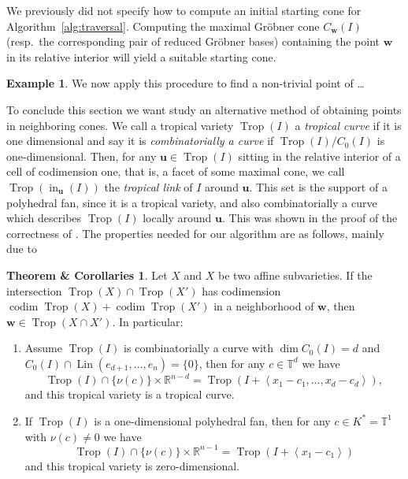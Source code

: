 \documentclass[
  paper=a4,
  titlepage,
  bibliography=totoc,
  listof=totoc,
  pagesize=pdftex
]{scrartcl}
\numberwithin{figure}{section}
\numberwithin{equation}{section}
\numberwithin{table}{section}
\newcommand*\setR{\mathds{R}}
\newcommand*\setT{\mathds{T}}
\newcommand*\ideal[1]{\left\langle #1 \right\rangle}
\let\vec\mathbf
\DeclareMathOperator{\Trop}{Trop}
\DeclareMathOperator{\initial}{in}
\DeclareMathOperator{\Lin}{Lin}
\DeclareMathOperator{\codim}{codim}
\theoremstyle{definition}
\newtheorem{example}[definition]{Example}
\newtheorem{thmCorollary}[definition]{Theorem \& Corollaries}
\numberwithin{definition}{section}
\begin{document}
We previously did not specify how to compute an initial starting cone for
Algorithm~\ref{alg:traversal}. Computing the maximal Gröbner cone $C_{\vec w}(I)$ (resp.\
the corresponding pair of reduced Gröbner bases) containing the point $\vec w$ in its
relative interior will yield a suitable starting cone.

\begin{example}
  We now apply this procedure to find a non-trivial point of \dots%
\end{example}

To conclude this section we want study an alternative method of obtaining points in
neighboring cones. We call a tropical variety $\Trop(I)$ a \emph{tropical curve} if it is
one dimensional and say it is \emph{combinatorially a curve} if $\Trop(I)/C_0(I)$ is
one-dimensional. Then, for any $\vec u \in \Trop(I)$ sitting in the relative interior of a
cell of codimension one, that is, a facet of some maximal cone, we call
$\Trop(\initial_{\vec u}(I))$ the \emph{tropical link} of $I$ around $\vec u$. This set is
the support of a polyhedral fan, since it is a tropical variety, and also combinatorially
a curve which describes $\Trop(I)$ locally around $\vec u$. This was shown in the proof of
the correctness of \cite[Algorithm~4.10]{compTropVar}. The properties needed for our
algorithm are as follows, mainly due to \cite{ossTropLift}

\begin{thmCorollary} \label{thmc:tropInt}
  Let $X$ and $X$ be two affine subvarieties. If the intersection $\Trop(X) \cap
  \Trop(X')$ has codimension $\codim\Trop(X) + \codim\Trop(X')$ in a neighborhood of $\vec
  w$, then $\vec w \in \Trop(X\cap X')$. In particular:
  \begin{enumerate}
    \item Assume $\Trop(I)$ is combinatorially a curve with $\dim C_0(I) = d$ and
      $C_0(I)\cap \Lin(e_{d+1}, \dots, e_n) = \{0\}$, then for any $c \in \setT^d$ we have
      \[
        \Trop(I) \cap \{\nu(c)\} \times \setR^{n-d} = \Trop(I + \ideal{x_1-c_1, \dots,
        x_d-c_d}),
      \]
      and this tropical variety is a tropical curve.
      \label{thmc:i}
    \item If $\Trop(I)$ is a one-dimensional polyhedral fan, then for any $c \in K^* =
      \setT^1$ with $\nu(c)\neq0$ we have
      \[
        \Trop(I) \cap \{\nu(c)\} \times \setR^{n-1} = \Trop(I + \ideal{x_1-c_1})
      \]
      and this tropical variety is zero-dimensional.
      \label{thmc:ii}
  \end{enumerate}
\end{thmCorollary}
\end{document}
